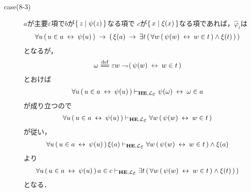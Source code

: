 \begin{metaprf}
\begin{description}
\begin{description}
					\item[case(8-3)] $a$が主要$\varepsilon$項で$b$が$\{\, z \mid \psi(z)\, \}$なる項で
						$c$が$\{\, x \mid \xi(x)\, \}$なる項であれば，$\widehat{\varphi}_{i}$は
						\begin{align}
							\forall u\, (\, u \in a \hspace{0.25em}\leftrightarrow\hspace{0.25em} \psi(u)\, ) 
							\hspace{0.25em}\rightarrow\hspace{0.25em} (\, \xi(a) 
							\hspace{0.25em}\rightarrow\hspace{0.25em} \exists t\, (\, \forall w\, (\, \psi(w) \hspace{0.25em}\leftrightarrow\hspace{0.25em} w \in t\, ) \wedge \xi(t)\, )\, )
						\end{align}
						となるが，
						\begin{align}
							\omega \defeq \varepsilon w \negation (\, \psi(w) \lrarrow w \in t\, )
						\end{align}
						とおけば
						\begin{align}
							\forall u\, (\, u \in a \lrarrow \psi(u)\, )
							\provable{\mbox{{\bf HE}},\lang{\varepsilon}} \psi(\omega) \lrarrow \omega \in a 
						\end{align}
						が成り立つので
						\begin{align}
							\forall u\, (\, u \in a \lrarrow \psi(u)\, )
							\provable{\mbox{{\bf HE}},\lang{\varepsilon}} \forall w\, (\, \psi(w) \lrarrow w \in t\, )
						\end{align}
						が従い，
						\begin{align}
							\forall u\, (\, u \in a \lrarrow \psi(u)\, )\, \xi(a)
							\provable{\mbox{{\bf HE}},\lang{\varepsilon}} \forall w\, (\, \psi(w) \lrarrow w \in t\, ) \wedge \xi(a)
						\end{align}
						より
						\begin{align}
							\forall u\, (\, u \in a \lrarrow \psi(u)\, )\, a \in c
							\provable{\mbox{{\bf HE}},\lang{\varepsilon}} \exists t\, (\, \forall w\, (\, \psi(w) \lrarrow w \in t\, ) \wedge \xi(t)\, )\, )
						\end{align}
						となる．
						

\end{description}
\end{description}
\end{metaprf}

